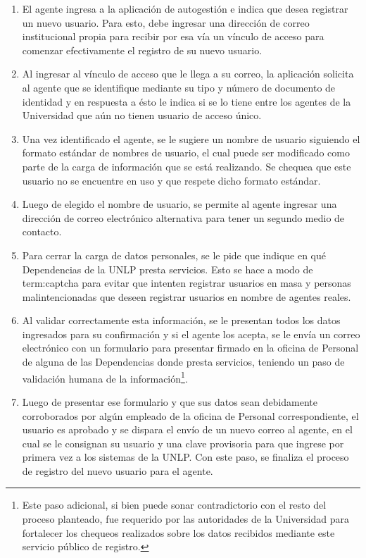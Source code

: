 \begin{enumerate}
  \item El agente ingresa a la aplicación de autogestión e indica que desea registrar un nuevo usuario. Para esto, debe ingresar una dirección de correo institucional propia para recibir por esa vía un vínculo de acceso para comenzar efectivamente el registro de su nuevo usuario.

  \item Al ingresar al vínculo de acceso que le llega a su correo, la aplicación solicita al agente que se identifique mediante su tipo y número de documento de identidad y en respuesta a ésto le indica si se lo tiene entre los agentes de la Universidad que aún no tienen usuario de acceso único.

  \item Una vez identificado el agente, se le sugiere un nombre de usuario siguiendo el formato estándar de nombres de usuario, el cual puede ser modificado como parte de la carga de información que se está realizando. Se chequea que este usuario no se encuentre en uso y que respete dicho formato estándar.

  \item Luego de elegido el nombre de usuario, se permite al agente ingresar una dirección de correo electrónico alternativa para tener un segundo medio de contacto.

  \item Para cerrar la carga de datos personales, se le pide que indique en qué Dependencias de la UNLP presta servicios. Esto se hace a modo de \gls{term:captcha} para evitar  que intenten registrar usuarios en masa y personas malintencionadas que deseen registrar usuarios en nombre de agentes reales.

  \item Al validar correctamente esta información, se le presentan todos los datos ingresados para su confirmación y si el agente los acepta, se le envía un correo electrónico con un formulario para presentar firmado en la oficina de Personal de alguna de las Dependencias donde presta servicios, teniendo un paso de validación humana de la información\footnote{Este paso adicional, si bien puede sonar contradictorio con el resto del proceso  planteado, fue requerido por las autoridades de la Universidad para fortalecer los chequeos realizados sobre los datos recibidos mediante este servicio público de registro.}.

  \item Luego de presentar ese formulario y que sus datos sean debidamente corroborados por algún empleado de la oficina de Personal correspondiente, el usuario es aprobado y se dispara el envío de un nuevo correo al agente, en el cual se le consignan su usuario y una clave provisoria para que ingrese por primera vez a los sistemas de la UNLP. Con este paso, se finaliza el proceso de registro del nuevo usuario para el agente.
\end{enumerate}

